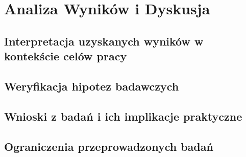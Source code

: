 \newpage

\section{Analiza Wyników i Dyskusja}

\subsection{Interpretacja uzyskanych wyników w kontekście celów pracy}

\subsection{Weryfikacja hipotez badawczych}

\subsection{Wnioski z badań i ich implikacje praktyczne}

\subsection{Ograniczenia przeprowadzonych badań}